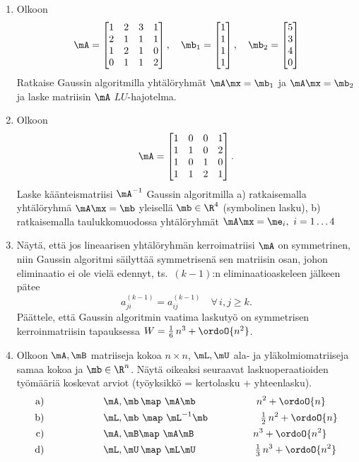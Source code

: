 \begin{enumerate}
\item
Olkoon
\[
\mA   = \begin{bmatrix} 1&2&3&1\\2&1&1&1\\1&2&1&0\\0&1&1&2 \end{bmatrix}, \quad
\mb_1 = \begin{bmatrix} 1\\1\\1\\1 \end{bmatrix}, \quad
\mb_2 = \begin{bmatrix} 5\\3\\4\\0 \end{bmatrix}
\]
Ratkaise Gaussin algoritmilla yhtälöryhmät $\mA\mx=\mb_1$ ja $\mA\mx=\mb_2$ ja laske matriisin
$\mA$ $LU$-hajotelma.

\item
Olkoon
\[
\mA=\begin{bmatrix} 1&0&0&1\\1&1&0&2\\1&0&1&0\\1&1&2&1 \end{bmatrix}.
\]
Laske käänteismatriisi $\mA^{-1}$ Gaussin algoritmilla \vspace{1mm}\newline 
a) ratkaisemalla yhtälöryhmä $\mA\mx=\mb$ yleisellä $\mb\in\R^4$ (symbolinen lasku), \newline
b) ratkaisemalla taulukkomuodossa yhtälöryhmät $\mA\mx=\me_i,\ i=1 \ldots 4$

\item
Näytä, että jos lineaarisen yhtälöryhmän kerroimatriisi $\mA$ on symmetrinen, niin Gaussin 
algoritmi säilyttää symmetrisenä sen matriisin osan, johon eliminaatio ei ole vielä edennyt,
ts.\ $(k-1)$:n eliminaatioaskeleen jälkeen pätee
\[
a_{ji}^{(k-1)}=a_{ij}^{(k-1)} \quad \forall\,i,j \ge k.
\]
Päättele, että Gaussin algoritmin vaatima laskutyö on symmetrisen kerroinmatriisin tapauksessa
$W=\frac{1}{6}\,n^3+\ordoO{n^2}$.

\item \label{H-m-3: työmääriä 1}
Olkoon $\mA,\mB$ matriiseja kokoa $n \times n$, $\mL,\mU$ ala- ja yläkolmiomatriiseja samaa
kokoa ja $\mb\in\R^n$. Näytä oikeaksi seuraavat laskuoperaatioiden työmääriä koskevat arviot
(työyksikkö = kertolasku + yhteenlasku).
\begin{align*}
\text{a)} \qquad\qquad\qquad &\mA,\mb\,\map\ \mA\mb \qquad\qquad\qquad\, n^2+\ordoO{n} \\
\text{b)} \qquad\qquad\qquad &\mL,\mb\ \map\ 
                              \mL^{-1}\mb \qquad\qquad\quad\ \tfrac{1}{2}\,n^2+\ordoO{n} \\
\text{c)} \qquad\qquad\qquad &\mA,\mB \map\ \mA\mB \qquad\qquad\qquad   n^3+\ordoO{n^2} \\
\text{d)} \qquad\qquad\qquad &\mL,\mU\,\map\ 
                              \mL\mU \qquad\qquad\qquad  \tfrac{1}{3}\,n^3+\ordoO{n^2}
\end{align*}


\end{enumerate}
